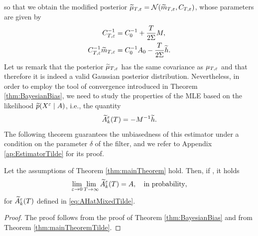 \documentclass[10pt]{article}
\begin{document}
so that we obtain the modified posterior $\widetilde \mu_{T,\varepsilon} = \mathcal N(\widetilde m_{T, \varepsilon}, C_{T, \varepsilon})$, whose parameters are given by
\begin{equation}
\begin{aligned}
	C_{T, \varepsilon}^{-1} &= C_0^{-1} + \frac{T}{2\Sigma} M, \\
	C_{T,\varepsilon}^{-1}\widetilde m_{T,\varepsilon} &= C_0^{-1}A_0 - \frac{T}{2\Sigma} \widetilde h. 
\end{aligned}	
\end{equation}
Let us remark that the posterior $\widetilde \mu_{T,\varepsilon}$ has the same covariance as $\mu_{T,\varepsilon}$ and that therefore it is indeed a valid Gaussian posterior distribution. Nevertheless, in order to employ the tool of convergence introduced in Theorem \ref{thm:BayesianBias}, we need to study the properties of the MLE based on the likelihood $\widetilde p(X^\varepsilon \mid A)$, i.e., the quantity
\begin{equation}\label{eq:AHatMixedTilde}
	\widetilde A^\varepsilon_k(T) = - M^{-1} \widetilde h.
\end{equation}
The following theorem guarantees the unbiasedness of this estimator under a condition on the parameter $\delta$ of the filter, and we refer to Appendix \ref{ap:EstimatorTilde} for its proof.
\begin{theorem}\label{thm:mainTheoremTilde} Let the assumptions of Theorem \ref{thm:mainTheorem} hold. Then, if , it holds
	\begin{equation}
	\lim_{\varepsilon \to 0} \lim_{T \to \infty} \widetilde A^\varepsilon_k(T) = A, \quad \text{in probability},
	\end{equation} 
	for $\widetilde A^\varepsilon_k(T)$ defined in \eqref{eq:AHatMixedTilde}.
\end{theorem}

\begin{proof} The proof follows from the proof of Theorem \ref{thm:BayesianBias} and from Theorem \ref{thm:mainTheoremTilde}.
\end{proof}
\end{document}
